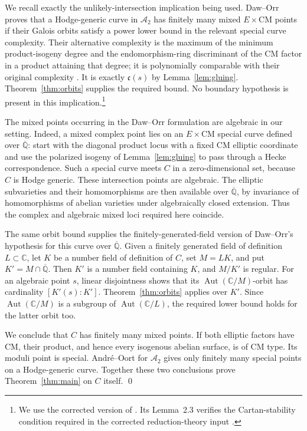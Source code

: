 \documentclass[11pt,a4paper]{article}
\numberwithin{equation}{section}
\theoremstyle{definition}
\theoremstyle{remark}
\newcommand{\A}{\mathcal A}
\newcommand{\C}{\mathbb C}
\newcommand{\Qbar}{\overline{\mathbb Q}}
\newcommand{\CM}{\mathrm{CM}}
\newcommand{\cplx}{\mathfrak c}
\begin{document}
We recall exactly the unlikely-intersection implication being used.
Daw--Orr \cite[Theorem~1.2]{DO} proves that a Hodge-generic curve in
\(\A_2\) has finitely many mixed \(E\times\CM\) points if their
Galois orbits satisfy a power lower bound in the relevant special
curve complexity. Their alternative complexity is the maximum of
the minimum product-isogeny degree and the endomorphism-ring
discriminant of the CM factor in a product attaining that degree;
it is polynomially comparable with their original complexity
\cite[\S3, especially Lemmas~3.1 and~3.6]{DO}.
It is exactly \(\cplx(s)\) by Lemma~\ref{lem:gluing}.
Theorem~\ref{thm:orbits} supplies the required bound.
No boundary hypothesis is present in this implication.\footnote{We use
the corrected version of \cite{DO}. Its Lemma~2.3 verifies the
Cartan-stability condition required in the corrected reduction-theory
input \cite{OS}.}

The mixed points occurring in the Daw--Orr formulation are algebraic
in our setting. Indeed, a mixed complex point
lies on an \(E\times\CM\) special curve defined over \(\Qbar\):
start with the diagonal product locus with a fixed CM elliptic
coordinate and use the polarized isogeny of
Lemma~\ref{lem:gluing} to pass through a Hecke correspondence.
Such a special curve meets \(C\) in a zero-dimensional set, because
\(C\) is Hodge generic. These intersection points are algebraic.
The elliptic subvarieties and their homomorphisms are then available
over \(\Qbar\), by invariance of homomorphisms of abelian varieties
under algebraically closed extension. Thus the complex and algebraic
mixed loci required here coincide.

The same orbit bound supplies the finitely-generated-field version
of Daw--Orr's hypothesis for this curve over \(\Qbar\).
Given a finitely generated field of definition \(L\subset\C\), let
\(K\) be a number field of definition of \(C\), set \(M=LK\), and
put \(K'=M\cap\Qbar\). Then \(K'\) is a number field containing
\(K\), and \(M/K'\) is regular. For an algebraic point \(s\),
linear disjointness shows that its \(\operatorname{Aut}(\C/M)\)-orbit
has cardinality \([K'(s):K']\). Theorem~\ref{thm:orbits} applies
over \(K'\). Since \(\operatorname{Aut}(\C/M)\) is a subgroup of
\(\operatorname{Aut}(\C/L)\), the required lower bound holds for
the latter orbit too.

We conclude that \(C\) has finitely many mixed points. If both
elliptic factors have CM, their product, and hence every isogenous
abelian surface, is of CM type. Its moduli point is special.
Andr\'e--Oort for \(\A_2\) gives only finitely many special points
on a Hodge-generic curve. Together these two conclusions prove
Theorem~\ref{thm:main} on \(C\) itself.
\qed
\end{document}
